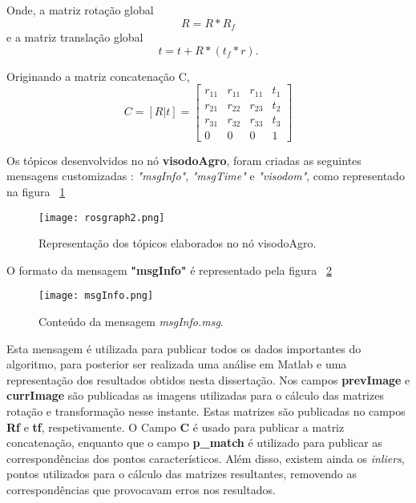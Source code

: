 Onde, a matriz rotação global \[ R = R * R_f\]
e a matriz translação global \[ t = t + R * ( t_f * r ) . \]

Originando a matriz concatenação C, \[ C = \left[ R | t \right] = \left[ \begin{array}{cccc}
r_{11} & r_{11} & r_{11} & t_1 \\ 
r_{21} & r_{22} & r_{23} & t_2 \\ 
r_{31} & r_{32} & r_{33} & t_3 \\ 
0 & 0 & 0 & 1
\end{array} \right] \] 






Os tópicos desenvolvidos no nó \textbf{visodoAgro}, foram criadas as seguintes mensagens customizadas : \textit{"msgInfo"}, \textit{"msgTime"} e \textit{"visodom"}, como representado na figura ~\ref{fig:rosgraph}

\begin{figure}[h!] %
	\begin{center}
		\leavevmode		
		\texttt{[image: rosgraph2.png]}
		\caption{Representação dos tópicos elaborados no nó visodoAgro.}
		\label{fig:rosgraph}
	\end{center}
\end{figure}

O formato da mensagem \textbf{"msgInfo"} é representado pela figura  ~\ref{fig:msgInfo}

 \begin{figure}[h!] %
 	\begin{center}
 		\leavevmode		
 		\texttt{[image: msgInfo.png]}
 		\caption{Conteúdo da mensagem \textit{msgInfo.msg}.}
 		\label{fig:msgInfo}
 	\end{center}
 \end{figure}
 



Esta mensagem é utilizada para publicar todos os dados importantes do algoritmo, para posterior ser realizada uma análise em Matlab e uma representação dos resultados obtidos nesta dissertação. 
Nos campos \textbf{prevImage} e \textbf{currImage} são publicadas as imagens utilizadas para o cálculo das matrizes rotação e transformação nesse instante. Estas matrizes são publicadas no campos \textbf{Rf} e \textbf{tf}, respetivamente. 
O Campo \textbf{C} é usado para publicar a matriz concatenação, enquanto que o campo  \textbf{p\_match} é utilizado para publicar as correspondências dos pontos característicos. Além disso, existem ainda os \textit{inliers}, pontos utilizados para o cálculo das matrizes resultantes, removendo as correspondências que provocavam erros nos resultados.  



